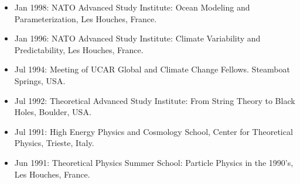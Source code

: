 \documentclass{article}
\begin{document}
\begin{itemize}[leftmargin=*]

\item Jan 1998: NATO Advanced Study Institute: {\sc Ocean Modeling
    and Parameterization}, Les Houches, France.

\item Jan 1996: NATO Advanced Study Institute: {\sc Climate
  Variability and Predictability}, Les Houches, France.

\item Jul 1994: Meeting of UCAR Global and Climate Change Fellows.
Steamboat Springs, USA.  

\item Jul 1992: Theoretical Advanced Study Institute: {\sc From
  String Theory to Black Holes}, Boulder, USA.

\item Jul 1991: High Energy Physics and Cosmology School, Center for
Theoretical Physics, Trieste, Italy.

\item Jun 1991: Theoretical Physics Summer School: {\sc Particle
  Physics in the 1990's}, Les Houches, France.

\end{itemize}


%

\end{document}
